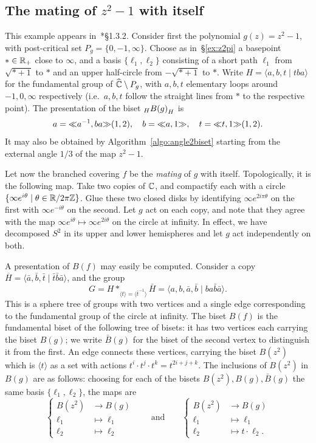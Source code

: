 \documentclass{amsart}
\begin{document}
\subsection{\myboldmath The mating of $z^2-1$ with itself}\label{ex:z2m1}
This example appears
in~\cite{pilgrim:combinations}*{\S1.3.2}. Consider first the
polynomial $g(z)=z^2-1$, with post-critical set
$P_g=\{0,-1,\infty\}$. Choose as in~\S\ref{ex:z2pi} a basepoint
$*\in{\mathbb R}_+$ close to $\infty$, and a basis $\{\ell_1,\ell_2\}$
consisting of a short path $\ell_1$ from $\sqrt{*+1}$ to $*$ and an
upper half-circle from $-\sqrt{*+1}$ to $*$. Write
$H=\langle a,b,t\mid t b a\rangle$ for the fundamental group of
${\widehat{{\mathbb C}}}\setminus P_g$, with $a,b,t$ elementary loops around $-1,0,\infty$
respectively (i.e.\ $a,b,t$ follow the straight lines from $*$ to the
respective point). The presentation of the biset
$\subscript H{B(g)}_H$ is
\[a={\ll}a^{-1},b a{\gg}(1,2),\quad b={\ll}a,1{\gg},\quad t={\ll}t,1{\gg}(1,2).
\]
It may also be obtained by Algorithm~\ref{algo:angle2biset} starting
from the external angle $1/3$ of the map $z^2-1$.

Let now the branched covering $f$ be the \emph{mating} of $g$ with
itself. Topologically, it is the following map. Take two copies of
${\mathbb C}$, and compactify each with a circle
$\{\infty e^{i\theta}\mid\theta\in{\mathbb R}/2\pi{\mathbb Z}\}$. Glue these two closed
disks by identifying $\infty e^{2i\pi\theta}$ on the first with
$\infty e^{-i\theta}$ on the second. Let $g$ act on each copy, and
note that they agree with the map
$\infty e^{i\theta}\mapsto\infty e^{2i\theta}$ on the circle at
infinity. In effect, we have decomposed $S^2$ in its upper and lower
hemispheres and let $g$ act independently on both.

A presentation of $B(f)$ may easily be computed. Consider a copy
$\overline H=\langle \bar a,\bar b,\bar t\mid\bar t\bar b\bar
a\rangle$, and the group
\[G=H*_{\langle t\rangle=\langle\bar t^{-1}\rangle}\bar H=\langle
a,b,\bar a,\bar b\mid b a\bar b\bar a\rangle.\]
This is a sphere tree of groups with two vertices and a single edge
corresponding to the fundamental group of the circle at infinity. The
biset $B(f)$ is the fundamental biset of the following tree of
bisets: it has two vertices each carrying the biset $B(g)$; we write
$\bar B(g)$ for the biset of the second vertex to distinguish it from
the first. An edge connects these vertices, carrying the biset
$B(z^2)$ which is $\langle t\rangle$ as a set with actions
$t^i\cdot t^j\cdot t^k=t^{2i+j+k}$. The inclusions of $B(z^2)$ in
$B(g)$ are as follows: choosing for each of the bisets
$B(z^2),B(g),\bar B(g)$ the same basis $\{\ell_1,\ell_2\}$, the maps are
\[\begin{cases} B(z^2)&\to B(g)\\
  \ell_1&\mapsto\ell_1\\
  \ell_2&\mapsto\ell_2
\end{cases}\qquad\text{and}\qquad
\begin{cases} B(z^2)&\to B(g)\\
  \ell_1&\mapsto\ell_1\\
  \ell_2&\mapsto t\cdot\ell_2.
\end{cases}\]
\end{document}
